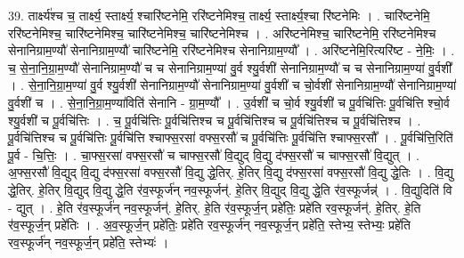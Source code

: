 \documentclass[17pt]{extarticle}
\begin{document}
39. तार्क्ष्य॑श्च च॒ तार्क्ष्य॒ स्तार्क्ष्य॒ श्चारि॑ष्टनेमि॒ ररि॑ष्टनेमिश्च॒ तार्क्ष्य॒ स्तार्क्ष्य॒श्चा रि॑ष्टनेमिः । . चारि॑ष्टनेमि॒ ररि॑ष्टनेमिश्च॒ चारि॑ष्टनेमिश्च॒ चारि॑ष्टनेमिश्च॒ चारि॑ष्टनेमिश्च । . अरि॑ष्टनेमिश्च॒ चारि॑ष्टनेमि॒ ररि॑ष्टनेमिश्च सेनानिग्राम॒ण्यौ॑ सेनानिग्राम॒ण्यौ॑ चारि॑ष्टनेमि॒ ररि॑ष्टनेमिश्च सेनानिग्राम॒ण्यौ᳚ । . अरि॑ष्टनेमि॒रित्यरि॑ष्ट - ने॒मिः॒ । . च॒ से॒ना॒नि॒ग्रा॒म॒ण्यौ॑ सेनानिग्राम॒ण्यौ॑ च च सेनानिग्राम॒ण्या॑ वु॒र्व श्यु॒र्वशी॑ सेनानिग्राम॒ण्यौ॑ च च सेनानिग्राम॒ण्या॑ वु॒र्वशी᳚ । . से॒ना॒नि॒ग्रा॒म॒ण्या॑ वु॒र्व श्यु॒र्वशी॑ सेनानिग्राम॒ण्यौ॑ सेनानिग्राम॒ण्या॑ वु॒र्वशी॑ च चो॒र्वशी॑ सेनानिग्राम॒ण्यौ॑ सेनानिग्राम॒ण्या॑ वु॒र्वशी॑ च । . से॒ना॒नि॒ग्रा॒म॒ण्या॑विति॑ सेनानि - ग्रा॒म॒ण्यौ᳚ । . उ॒र्वशी॑ च चो॒र्व श्यु॒र्वशी॑ च पू॒र्वचि॑त्तिः पू॒र्वचि॑त्ति श्चो॒र्व श्यु॒र्वशी॑ च पू॒र्वचि॑त्तिः । . च॒ पू॒र्वचि॑त्तिः पू॒र्वचि॑त्तिश्च च पू॒र्वचि॑त्तिश्च च पू॒र्वचि॑त्तिश्च च पू॒र्वचि॑त्तिश्च । . पू॒र्वचि॑त्तिश्च च पू॒र्वचि॑त्तिः पू॒र्वचि॑त्ति श्चाफ्स॒रसा॑ वफ्स॒रसौ॑ च पू॒र्वचि॑त्तिः पू॒र्वचि॑त्ति श्चाफ्स॒रसौ᳚ । . पू॒र्वचि॑त्ति॒रिति॑ पू॒र्व - चि॒त्तिः॒ । . चा॒फ्स॒रसा॑ वफ्स॒रसौ॑ च चाफ्स॒रसौ॑ वि॒द्युद् वि॒द्यु द॑फ्स॒रसौ॑ च चाफ्स॒रसौ॑ वि॒द्युत् । . अ॒फ्स॒रसौ॑ वि॒द्युद् वि॒द्यु द॑फ्स॒रसा॑ वफ्स॒रसौ॑ वि॒द्यु द्धे॒तिर्. हे॒तिर् वि॒द्यु द॑फ्स॒रसा॑ वफ्स॒रसौ॑ वि॒द्यु द्धे॒तिः । . वि॒द्यु द्धे॒तिर्. हे॒तिर् वि॒द्युद् वि॒द्यु द्धे॒ति र॑व॒स्फूर्ज॑न् नव॒स्फूर्जन्॑. हे॒तिर् वि॒द्युद् वि॒द्यु द्धे॒ति र॑व॒स्फूर्जन्न्॑ । . वि॒द्युदिति॑ वि - द्युत् । . हे॒ति र॑व॒स्फूर्ज॑न् नव॒स्फूर्जन्॑. हे॒तिर्. हे॒ति र॑व॒स्फूर्ज॒न् प्रहे॑तिः॒ प्रहे॑ति रव॒स्फूर्जन्॑. हे॒तिर्. हे॒ति र॑व॒स्फूर्ज॒न् प्रहे॑तिः । . अ॒व॒स्फूर्ज॒न् प्रहे॑तिः॒ प्रहे॑ति रव॒स्फूर्ज॑न् नव॒स्फूर्ज॒न् प्रहे॑ति॒ स्तेभ्य॒ स्तेभ्यः॒ प्रहे॑ति रव॒स्फूर्ज॑न् नव॒स्फूर्ज॒न् प्रहे॑ति॒ स्तेभ्यः॑ । \newline
\end{document}
